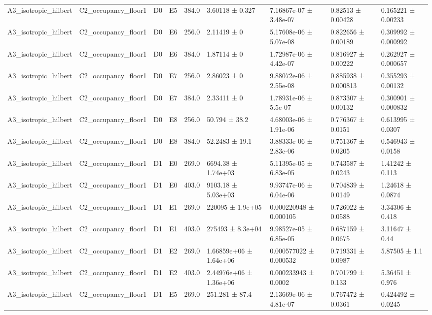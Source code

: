 \begin{table}
\begin{tabular}{lllllllll}
A3\_isotropic\_hilbert & C2\_occupancy\_floor1 & D0 & E5 & 384.0 & 3.60118 ± 0.327 & 7.16867e-07 ± 3.48e-07 & 0.82513 ± 0.00428 & 0.165221 ± 0.00233 \\
A3\_isotropic\_hilbert & C2\_occupancy\_floor1 & D0 & E6 & 256.0 & 2.11419 ± 0 & 5.17608e-06 ± 5.07e-08 & 0.822656 ± 0.00189 & 0.309992 ± 0.000992 \\
A3\_isotropic\_hilbert & C2\_occupancy\_floor1 & D0 & E6 & 384.0 & 1.87114 ± 0 & 1.72987e-06 ± 4.42e-07 & 0.816927 ± 0.00222 & 0.262927 ± 0.000657 \\
A3\_isotropic\_hilbert & C2\_occupancy\_floor1 & D0 & E7 & 256.0 & 2.86023 ± 0 & 9.88072e-06 ± 2.55e-08 & 0.885938 ± 0.000813 & 0.355293 ± 0.00132 \\
A3\_isotropic\_hilbert & C2\_occupancy\_floor1 & D0 & E7 & 384.0 & 2.33411 ± 0 & 1.78931e-06 ± 5.5e-07 & 0.873307 ± 0.00132 & 0.300901 ± 0.000832 \\
A3\_isotropic\_hilbert & C2\_occupancy\_floor1 & D0 & E8 & 256.0 & 50.794 ± 38.2 & 4.68003e-06 ± 1.91e-06 & 0.776367 ± 0.0151 & 0.613995 ± 0.0307 \\
A3\_isotropic\_hilbert & C2\_occupancy\_floor1 & D0 & E8 & 384.0 & 52.2483 ± 19.1 & 3.88333e-06 ± 2.83e-06 & 0.751367 ± 0.0205 & 0.546943 ± 0.0158 \\
A3\_isotropic\_hilbert & C2\_occupancy\_floor1 & D1 & E0 & 269.0 & 6694.38 ± 1.74e+03 & 5.11395e-05 ± 6.83e-05 & 0.743587 ± 0.0243 & 1.41242 ± 0.113 \\
A3\_isotropic\_hilbert & C2\_occupancy\_floor1 & D1 & E0 & 403.0 & 9103.18 ± 5.03e+03 & 9.93747e-06 ± 6.04e-06 & 0.704839 ± 0.0149 & 1.24618 ± 0.0874 \\
A3\_isotropic\_hilbert & C2\_occupancy\_floor1 & D1 & E1 & 269.0 & 220095 ± 1.9e+05 & 0.000220948 ± 0.000105 & 0.726022 ± 0.0588 & 3.34306 ± 0.418 \\
A3\_isotropic\_hilbert & C2\_occupancy\_floor1 & D1 & E1 & 403.0 & 275493 ± 8.3e+04 & 9.98527e-05 ± 6.85e-05 & 0.687159 ± 0.0675 & 3.11647 ± 0.44 \\
A3\_isotropic\_hilbert & C2\_occupancy\_floor1 & D1 & E2 & 269.0 & 1.66859e+06 ± 1.64e+06 & 0.000577022 ± 0.000532 & 0.719331 ± 0.0987 & 5.87505 ± 1.1 \\
A3\_isotropic\_hilbert & C2\_occupancy\_floor1 & D1 & E2 & 403.0 & 2.44976e+06 ± 1.36e+06 & 0.000233943 ± 0.0002 & 0.701799 ± 0.133 & 5.36451 ± 0.976 \\
A3\_isotropic\_hilbert & C2\_occupancy\_floor1 & D1 & E5 & 269.0 & 251.281 ± 87.4 & 2.13669e-06 ± 4.81e-07 & 0.767472 ± 0.0361 & 0.424492 ± 0.0245 \\

\end{tabular}
\end{table}
